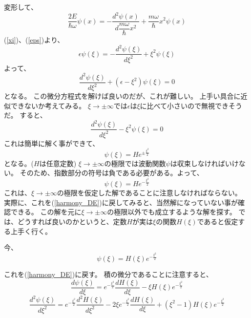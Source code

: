変形して、
\begin{equation}
  \dfrac{2E}{\hbar\omega}\psi(x) = - \dfrac{d^2 \psi(x)}{d \dfrac{m\omega}{\hbar} x^2} + \dfrac{m\omega}{\hbar} x^2\psi(x)
\end{equation}
(\ref{xi})、(\ref{eps})より、
\begin{equation}
  \epsilon\psi(\xi) = - \dfrac{d^2 \psi(\xi)}{d \xi^2} + \xi^2\psi(\xi)
\end{equation}
よって、
\begin{equation}
  \label{harmony_DE}
  \dfrac{d^2 \psi(\xi)}{d \xi^2} + (\epsilon - \xi^2)\psi(\xi) = 0
\end{equation}
となる。
この微分方程式を解けば良いのだが、これが難しい。
上手い具合に近似できないか考えてみる。
$\xi \to \pm \infty$では$\epsilon$は$\xi$に比べて小さいので無視できそうだ。
すると、
\begin{equation}
  \dfrac{d^2 \psi(\xi)}{d \xi^2}  - \xi^2\psi(\xi) = 0
\end{equation}
これは簡単に解く事ができて、
\begin{equation}
  \psi(\xi) = He^{\pm \frac{\xi^2}{2}}
\end{equation}
となる。($H$は任意定数)
$\xi \to \pm\infty$の極限では波動関数$\psi$は収束しなければいけない。
そのため、指数部分の符号は負である必要がある。よって、
\begin{equation}
  \psi(\xi) = He^{-\frac{\xi^2}{2}}
\end{equation}
これは、$\xi \to \pm \infty$の極限を仮定した解であることに注意しなければならない。
実際に、これを(\ref{harmony_DE})に戻してみると、当然解になっていない事が確認できる。
この解を元に$\xi \to \pm \infty$の極限以外でも成立するような解を探す。
では、どうすれば良いのかというと、定数$H$が実は$\xi$の関数$H(\xi)$であると仮定する上手く行く。

今、
\begin{equation}
  \psi(\xi) = H(\xi)e^{-\frac{\xi^2}{2}}
\end{equation}

これを(\ref{harmony_DE})に戻す。
積の微分であることに注意すると、
\begin{equation}
  \dfrac{d\psi(\xi)}{d\xi} = e^{-\frac{\xi^2}{2}}\dfrac{dH(\xi)}{d\xi} - \xi H(\xi)e^{-\frac{\xi^2}{2}}
\end{equation}
\begin{equation}
  \dfrac{d^2\psi(\xi)}{d\xi^2} = e^{-\frac{\xi^2}{2}}\dfrac{d^2 H(\xi)}{d\xi^2} -2\xi e^{-\frac{\xi^2}{2}}\dfrac{dH(\xi)}{d\xi}
  + (\xi^2 - 1)H(\xi)e^{-\frac{\xi^2}{2}}
\end{equation}


